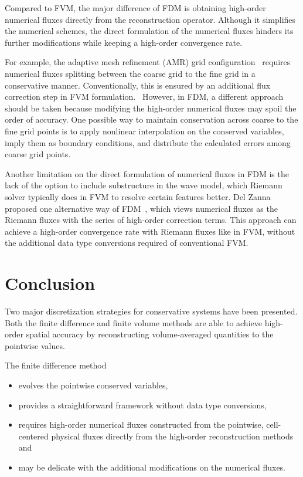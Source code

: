Compared to FVM, the major difference of FDM is obtaining high-order numerical fluxes
directly from the reconstruction operator.
Although it simplifies the numerical schemes, the direct formulation of the numerical fluxes
hinders its further modifications while keeping a high-order convergence rate.

For example, the adaptive mesh refinement (AMR) grid configuration~\cite{berger1989local,berger1998adaptive}
requires numerical fluxes splitting between the coarse grid to the fine grid in a conservative manner.
Conventionally, this is ensured by an additional flux correction step in FVM formulation.~\cite{berger1998adaptive}
However, in FDM, a different approach should be taken because modifying the high-order numerical fluxes
may spoil the order of accuracy.
One possible way to maintain conservation across coarse to the fine grid points
is to apply nonlinear interpolation on the conserved variables, imply them as boundary conditions,
and distribute the calculated errors among coarse grid points.~\cite{shen2011adaptive}

Another limitation on the direct formulation of numerical fluxes in FDM is
the lack of the option to include substructure in the wave model,
which Riemann solver typically does in FVM to resolve certain features better.
Del Zanna proposed one alternative way of FDM~\cite{del2003efficient,del2007echo},
which views numerical fluxes as the Riemann fluxes with the series of high-order correction terms.
This approach can achieve a high-order convergence rate with Riemann fluxes like in FVM,
without the additional data type conversions required of conventional FVM.~\cite{reyes2019variable}

\section{Conclusion}\label{sec:discrete_conclusion}

Two major discretization strategies for conservative systems have been presented.
Both the finite difference and finite volume methods are able to achieve
high-order spatial accuracy by reconstructing volume-averaged quantities to the pointwise values.

The finite difference method
\begin{itemize}
    \item evolves the pointwise conserved variables,
    \item provides a straightforward framework without data type conversions,
    \item requires high-order numerical fluxes constructed from the pointwise, cell-centered physical fluxes directly from the high-order reconstruction methods and
    \item may be delicate with the additional modifications on the numerical fluxes.
\end{itemize}

